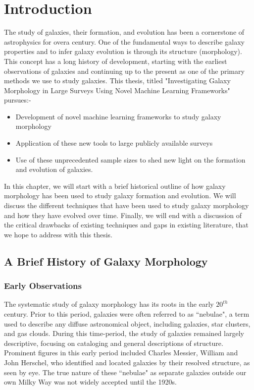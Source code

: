 \chapter{Introduction} \label{chap:intro}

The study of galaxies, their formation, and evolution has been a cornerstone of astrophysics for overa century. One of the fundamental ways to describe galaxy properties and to infer galaxy evolution is through its structure (morphology). This concept has a long history of development, starting with the earliest observations of galaxies and continuing up to the present as one of the primary methods we use to study galaxies. This thesis, titled "Investigating Galaxy Morphology in Large Surveys Using Novel Machine Learning Frameworks" pursues:-

\begin{itemize}
    \item Development of novel machine learning frameworks to study galaxy morphology
    \item Application of these new tools to large publicly available surveys
    \item Use of these unprecedented sample sizes to shed new light on the formation and evolution of galaxies. 
\end{itemize}

In this chapter, we will start with a brief historical outline of how galaxy morphology has been used to study galaxy formation and evolution. We will discuss the different techniques that have been used to study galaxy morphology and how they have evolved over time. Finally, we will end with a discussion of the critical drawbacks of existing techniques and gaps in existing literature, that we hope to address with this thesis. 

\section{A Brief History of Galaxy Morphology} \label{sec_intro:history}

\subsection{Early Observations} \label{sec_intro:early_obs}

The systematic study of galaxy morphology has its roots in the early $20^{th}$ century. Prior to this period, galaxies were often referred to as ``nebulae", a term used to describe any diffuse astronomical object, including galaxies, star clusters, and gas clouds. During this time-period, the study of galaxies remained largely descriptive, focusing on cataloging and general descriptions of structure. Prominent figures in this early period included Charles Messier, William and John Herschel, who identified and located galaxies by their resolved structure, as seen by eye. The true nature of these ``nebulae" as separate galaxies outside our own Milky Way was not widely accepted until the 1920s.

